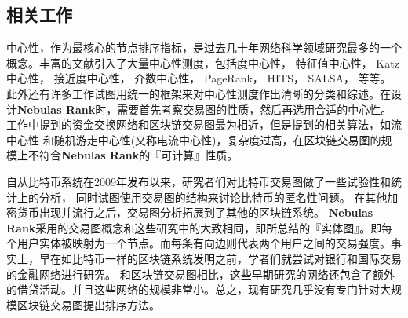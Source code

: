 \subsection{相关工作} \label{subsec:related}
中心性，作为最核心的节点排序指标，是过去几十年网络科学领域研究最多的一个概念\cite{newman2010networks}。丰富的文献引入了大量中心性测度，包括度中心性\cite{freeman1979set}， 特征值中心性\cite{bonacich1972factoring}， Katz中心性\cite{katz1953new}， 接近度中心性\cite{sabidussi1966centrality}， 介数中心性\cite{freeman1977set}\cite{freeman1978centrality}\cite{freeman1991centrality}\cite{noh2004random}\cite{newman2005measure}， PageRank\cite{Brin2010}， HITS\cite{kleinberg1999authoritative}， SALSA\cite{Science2001}， 等等。此外还有许多工作试图用统一的框架来对中心性测度作出清晰的分类和综述\cite{Borgatti2005}\cite{Borgatti2006}\cite{Lu2016}。在设计\textbf{Nebulas Rank}时，需要首先考察交易图的性质，然后再选用合适的中心性。\textcite{Borgatti2005}工作中提到的资金交换网络和区块链交易图最为相近，但是提到的相关算法，如流中心性\cite{freeman1991centrality} 和随机游走中心性(又称电流中心性)\cite{newman2005measure}，复杂度过高，在区块链交易图的规模上不符合\textbf{Nebulas Rank}的『可计算』性质。

自从比特币\cite{Nakamoto2008}系统在2009年发布以来，研究者们对比特币交易图做了一些试验性和统计上的分析\cite{Ron}\cite{Haslhofer}\cite{NielKondor2014}\cite{Baumann2014}， 同时试图使用交易图的结构来讨论比特币的匿名性问题\cite{Meiklejohn2013}\cite{Ober2013}\cite{pham2016anomaly}\cite{Fleder2015}\cite{Ferrin2015}。 在其他加密货币出现并流行之后，交易图分析拓展到了其他的区块链系统\cite{Chang2017}\cite{Anderson2016}。 \textbf{Nebulas Rank}采用的交易图概念和这些研究中的大致相同，即\textcite{Tschorsch2015}所总结的『实体图』。即每个用户实体被映射为一个节点。而每条有向边则代表两个用户之间的交易强度。事实上，早在如比特币一样的区块链系统发明之前，学者们就尝试对银行和国际交易的金融网络进行研究\cite{propper2008towards}\cite{Boss2004}\cite{Serrano2007}\cite{Bech2008}\cite{Fagiolo2009}\cite{Morten2006}\cite{Boss2004a}\cite{Krempel2002}\cite{Serrano2003}。 和区块链交易图相比，这些早期研究的网络还包含了额外的借贷活动。并且这些网络的规模非常小。总之，现有研究几乎没有专门针对大规模区块链交易图提出排序方法。

